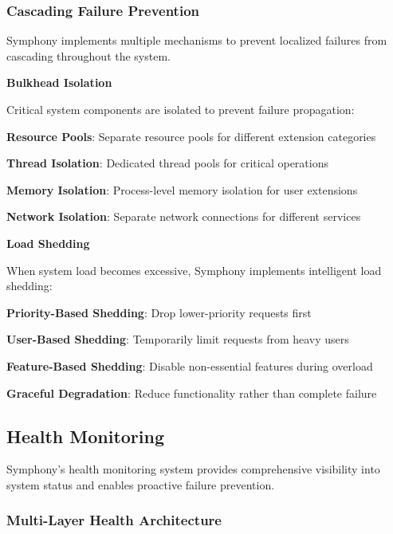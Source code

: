\subsubsection{Cascading Failure Prevention}

Symphony implements multiple mechanisms to prevent localized failures from cascading throughout the system.

\textbf{Bulkhead Isolation}

Critical system components are isolated to prevent failure propagation:

\begin{compactlist}
    \item \textbf{Resource Pools}: Separate resource pools for different extension categories
    \item \textbf{Thread Isolation}: Dedicated thread pools for critical operations
    \item \textbf{Memory Isolation}: Process-level memory isolation for user extensions
    \item \textbf{Network Isolation}: Separate network connections for different services
\end{compactlist}

\textbf{Load Shedding}

When system load becomes excessive, Symphony implements intelligent load shedding:

\begin{compactlist}
    \item \textbf{Priority-Based Shedding}: Drop lower-priority requests first
    \item \textbf{User-Based Shedding}: Temporarily limit requests from heavy users
    \item \textbf{Feature-Based Shedding}: Disable non-essential features during overload
    \item \textbf{Graceful Degradation}: Reduce functionality rather than complete failure
\end{compactlist}

\subsection{Health Monitoring}
\label{subsec:health-monitoring}

Symphony's health monitoring system provides comprehensive visibility into system status and enables proactive failure prevention.

\subsubsection{Multi-Layer Health Architecture}

